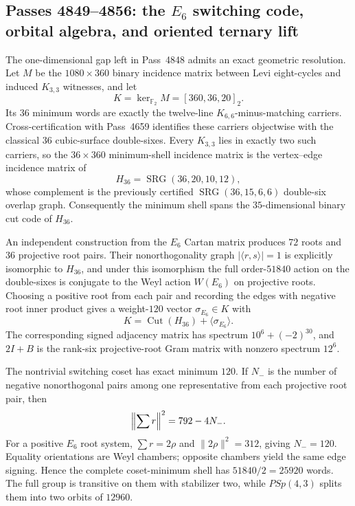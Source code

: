\subsection{Passes 4849--4856: the $E_6$ switching code, orbital algebra, and oriented ternary lift}
\label{subsec:pass4849-4856}

The one-dimensional gap left in Pass~4848 admits an exact geometric resolution.  Let $M$ be the $1080\times360$ binary incidence matrix between Levi eight-cycles and induced $K_{3,3}$ witnesses, and let
\[
K=\ker_{\mathbb F_2}M=[360,36,20]_2.
\]
Its $36$ minimum words are exactly the twelve-line $K_{6,6}$-minus-matching carriers.  Cross-certification with Pass~4659 identifies these carriers objectwise with the classical $36$ cubic-surface double-sixes.  Every $K_{3,3}$ lies in exactly two such carriers, so the $36\times360$ minimum-shell incidence matrix is the vertex--edge incidence matrix of
\[
H_{36}=\operatorname{SRG}(36,20,10,12),
\]
whose complement is the previously certified $\operatorname{SRG}(36,15,6,6)$ double-six overlap graph.  Consequently the minimum shell spans the $35$-dimensional binary cut code of $H_{36}$.

An independent construction from the $E_6$ Cartan matrix produces $72$ roots and $36$ projective root pairs.  Their nonorthogonality graph $|\langle r,s\rangle|=1$ is explicitly isomorphic to $H_{36}$, and under this isomorphism the full order-$51840$ action on the double-sixes is conjugate to the Weyl action $W(E_6)$ on projective roots.  Choosing a positive root from each pair and recording the edges with negative root inner product gives a weight-$120$ vector $\sigma_{E_6}\in K$ with
\[
K=\operatorname{Cut}(H_{36})+\langle\sigma_{E_6}\rangle.
\]
The corresponding signed adjacency matrix has spectrum $10^6+(-2)^{30}$, and $2I+B$ is the rank-six projective-root Gram matrix with nonzero spectrum $12^6$.

The nontrivial switching coset has exact minimum $120$.  If $N_-$ is the number of negative nonorthogonal pairs among one representative from each projective root pair, then
\[
\Bigl\|\sum r\Bigr\|^2=792-4N_-.
\]
For a positive $E_6$ root system, $\sum r=2\rho$ and $\|2\rho\|^2=312$, giving $N_-=120$.  Equality orientations are Weyl chambers; opposite chambers yield the same edge signing.  Hence the complete coset-minimum shell has $51840/2=25920$ words.  The full group is transitive on them with stabilizer two, while $PSp(4,3)$ splits them into two orbits of $12960$.

